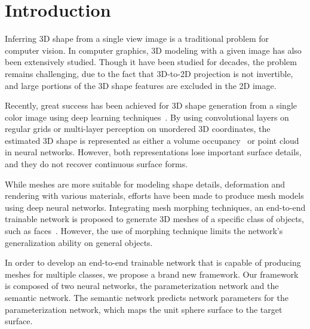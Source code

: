  \section{Introduction}
Inferring 3D shape from a single view image is a traditional problem for computer vision. In computer graphics, 3D modeling with a given image has also been extensively studied. 
Though it have been studied for decades, the problem remains challenging, due to the fact that 3D-to-2D projection is not invertible, and large portions of the 3D shape features are excluded in the 2D image. 

Recently, great success has been achieved for 3D shape generation from a single color image using deep learning techniques~\cite{3DR2N2,PSGN}. 
By using convolutional layers on regular grids or multi-layer
perception on unordered 3D coordinates, the estimated 3D shape is represented
as either a volume occupancy~\cite{3DR2N2} or point cloud~\cite{PSGN} in neural networks. 
However, both representations lose important surface details, and they do not recover continuous surface forms.


While meshes are more suitable for modeling shape details, deformation and rendering with various materials, efforts have been made to produce mesh models using deep neural networks. 
Integrating mesh morphing techniques, an end-to-end trainable network is proposed to generate 3D meshes of a specific class of objects, such as faces~\cite{endface}.
However, the use of morphing technique limits the network's generalization ability on general objects.
%

In order to develop an end-to-end trainable network that is capable of producing meshes for multiple classes, we propose a brand new framework. 
Our framework is composed of two neural networks, the parameterization network and the semantic network.
The semantic network predicts network parameters for the parameterization network, which maps the unit sphere surface to the target surface.


